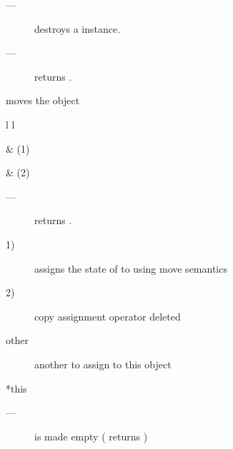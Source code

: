 \effects
\begin{description}
    \item[---] destroys a \fiber instance.
\end{description}

\requires
\begin{description}
    \item[---]  returns .
\end{description}


moves the \fiber object

\begin{tabular}{ l l }
    \midrule

     & (1)\\

    \midrule

     & (2)\\

    \midrule
\end{tabular}

\requires
\begin{description}
    \item[---]  returns .
\end{description}

\effects
\begin{description}
    \item[1)] assigns the state of  to  using move semantics
    \item[2)] copy assignment operator deleted
\end{description}

\params
\begin{description}
    \item[other]   another \fiber to assign to this object
\end{description}

\returns
\begin{description}
    \item[*this]
\end{description}

\postcond
\begin{description}
    \item[---]  is made empty ( returns )
\end{description}

